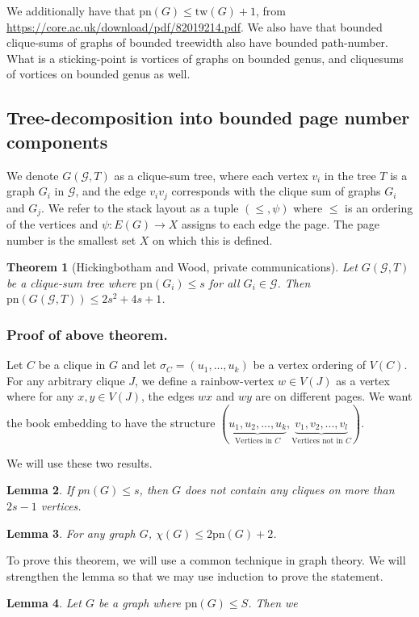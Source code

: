 \documentclass[]{article}
\newcommand{\tw}{\text{tw}}
\newcommand{\pn}{\text{pn}}
\newtheorem{theorem}{Theorem}
\newtheorem{lemma}[theorem]{Lemma}
\theoremstyle{definition}
\numberwithin{theorem}{section}
\numberwithin{equation}{section}
\begin{document}
We additionally have that $\pn(G) \leq \tw(G) + 1$, from \url{https://core.ac.uk/download/pdf/82019214.pdf}. 
We also have that bounded clique-sums of graphs of bounded treewidth also have bounded path-number.
What is a sticking-point is vortices of graphs on bounded genus, and cliquesums of vortices on bounded genus as well. 
\subsection{Tree-decomposition into bounded page number components}
We denote $G(\mathcal{G}, T)$ as a clique-sum tree, where each vertex $v_i$ in the tree $T$ is a graph $G_i$ in $\mathcal{G}$, and the edge $v_iv_j$ corresponds with the clique sum of graphs $G_i$ and $G_j$. We refer to the stack layout as a tuple $(\leq , \psi)$ where $\leq$ is an ordering of the vertices and $\psi : E(G) \rightarrow X$ assigns to each edge the page. The page number is the smallest set $X$ on which this is defined. 
\begin{theorem}[Hickingbotham and Wood, private communications]
	Let $G(\mathcal{G}, T)$ be a clique-sum tree where $\pn(G_i) \leq s$ for all $G_i \in \mathcal{G}$. Then $\pn(G(\mathcal{G}, T)) \leq 2s^2 + 4s + 1$.  
\end{theorem}

\subsubsection{Proof of above theorem.}
Let $C$ be a clique in $G$ and let $\sigma_C = (u_1, ... , u_k)$ be a vertex ordering of $V(C)$. For any arbitrary clique $J$, we define a rainbow-vertex $w \in V(J)$ as a vertex where for any $x, y \in V(J)$, the edges $wx$ and $wy$ are on different pages. We want the book embedding to have the structure $(\underbrace{u_1, u_2, ..., u_k}_{\text{Vertices in } C}, \underbrace{v_1, v_2, ..., v_l}_{\text{Vertices not in }C})$.

We will use these two results.
\begin{lemma}
	If $pn(G) \leq s$, then $G$ does not contain any cliques on more than $2s-1$ vertices.
\end{lemma}
\begin{lemma}
	For any graph $G$, $\chi(G) \leq 2 \pn(G) + 2$.
\end{lemma}

To prove this theorem, we will use a common technique in graph theory. We will strengthen the lemma so that we may use induction to prove the statement.
\begin{lemma}
	Let $G$ be a graph where $\pn(G) \leq S$. Then we 
\end{lemma}
\end{document}
